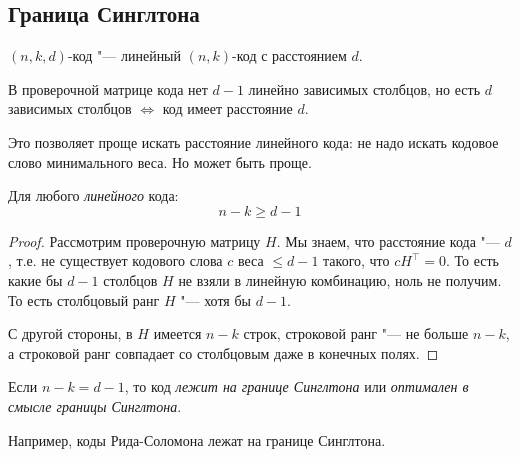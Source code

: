 \subsection{Граница Синглтона}
\begin{Def}
	$(n, k, d)$-код "--- линейный $(n, k)$-код с расстоянием $d$.
\end{Def}

\begin{theorem}
	В проверочной матрице кода нет $d-1$ линейно зависимых столбцов,
	но есть $d$ зависимых столбцов $\iff$ код имеет расстояние $d$.
\end{theorem}
\begin{Rem}
	Это позволяет проще искать расстояние линейного кода:
	не надо искать кодовое слово минимального веса.
	Но может быть проще.
\end{Rem}

\begin{theorem}
	Для любого \textit{линейного} кода:
	\[
	n - k \ge d - 1
	\]
\end{theorem}
\begin{proof}
	Рассмотрим проверочную матрицу $H$.
	Мы знаем, что расстояние кода "--- $d$,
	т.е. не существует кодового слова $c$ веса $\le d-1$ такого,
	что $cH^\top = 0$.
	То есть какие бы $d-1$ столбцов $H$ не взяли в линейную
	комбинацию, ноль не получим.
	То есть столбцовый ранг $H$ "--- хотя бы $d-1$.

	С другой стороны, в $H$ имеется $n-k$ строк,
	строковой ранг "--- не больше $n-k$,
	а строковой ранг совпадает со столбцовым даже в конечных полях.
\end{proof}
\begin{Rem}
	Если $n - k = d - 1$, то код \textit{лежит на границе Синглтона}
	или \textit{оптимален в смысле границы Синглтона}.
\end{Rem}
\begin{Rem}
	Например, коды Рида-Соломона лежат на границе Синглтона.
\end{Rem}

